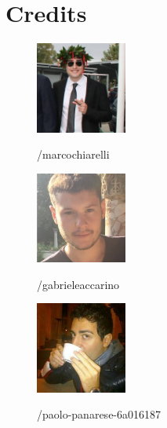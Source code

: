 \documentclass[11 pt,a4paper,twoside,openany]{book}
\begin{document}
\newpage

\section*{Credits}

\begin{figure}[h]
\includegraphics[width=3cm]{figures/marco.jpg}
\vspace{0.3cm}

%
\hspace{0.05cm} /marcochiarelli

\end{figure}

\begin{figure}[h]
\includegraphics[width=3cm]{figures/gabriele.jpg}
\vspace{0.3cm}

%
\hspace{0.05cm} /gabrieleaccarino

\end{figure}

\begin{figure}[h]
\includegraphics[width=3cm]{figures/paolo.jpg}
\vspace{0.3cm}

%
\hspace{0.05cm} /paolo-panarese-6a016187

\end{figure}
\end{document}
